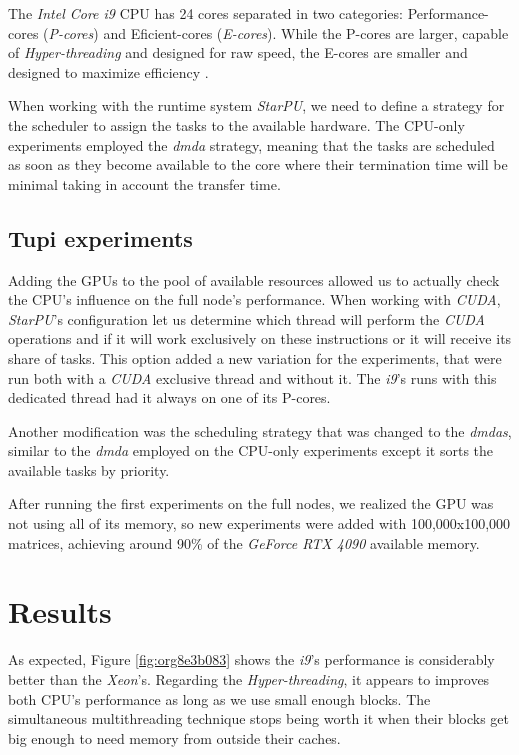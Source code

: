 \documentclass[ppgc,english]{iiufrgs}
\begin{document}
The \emph{Intel Core i9} CPU has 24 cores separated in two categories: Performance-cores (\emph{P-cores}) and Eficient-cores (\emph{E-cores}). While the
P-cores are larger, capable of \emph{Hyper-threading} and designed for raw speed, the E-cores are smaller and designed to maximize efficiency \cite{intel-hybrid}.

When working with the runtime system \emph{StarPU}, we need to define a strategy for the scheduler to assign the tasks to the available hardware. The
CPU-only experiments employed the \emph{dmda} strategy, meaning that the tasks are scheduled as soon as they become available to the core where their
termination time will be minimal taking in account the transfer time.

\section{Tupi experiments}
\label{sec:orga63fa3b}

Adding the GPUs to the pool of available resources allowed us to actually check the CPU's influence on the full node's performance. When working with
\emph{CUDA}, \emph{StarPU}'s configuration let us determine which thread will perform the \emph{CUDA} operations and if it will work exclusively on these instructions or it will
receive its share of tasks. This option added a new variation for the experiments, that were run both with a \emph{CUDA} exclusive thread and without it. The \emph{i9}'s
runs with this dedicated thread had it always on one of its P-cores.

Another modification was the scheduling strategy that was changed to the \emph{dmdas}, similar to the \emph{dmda} employed on the CPU-only experiments except it sorts the
available tasks by priority.

After running the first experiments on the full nodes, we realized the GPU was not using all of its memory, so new experiments were added with 100,000x100,000
matrices, achieving around 90\% of the \emph{GeForce RTX 4090} available memory.

\chapter{Results}
\label{sec:orgc7e57ac}

As expected, Figure \ref{fig:org8e3b083} shows the \emph{i9}'s performance is considerably better than the \emph{Xeon}'s. Regarding the \emph{Hyper-threading}, it appears to
improves both CPU's performance as long as we use small enough blocks. The simultaneous multithreading technique stops being worth it when
their blocks get big enough to need memory from outside their caches.
\end{document}
